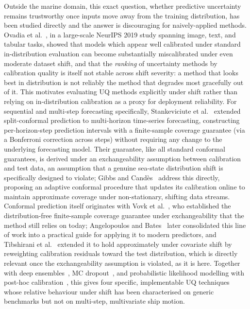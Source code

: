 \documentclass[a4paper,fleqn]{cas-sc}
\begin{document}
Outside the marine domain, this exact question, whether predictive uncertainty remains trustworthy once inputs move away from the training distribution, has been studied directly and the answer is discouraging for naively-applied methods. Ovadia et al.~\cite{ovadia2019can}, in a large-scale NeurIPS 2019 study spanning image, text, and tabular tasks, showed that models which appear well calibrated under standard in-distribution evaluation can become substantially miscalibrated under even moderate dataset shift, and that the \emph{ranking} of uncertainty methods by calibration quality is itself not stable across shift severity: a method that looks best in distribution is not reliably the method that degrades most gracefully out of it. This motivates evaluating UQ methods explicitly under shift rather than relying on in-distribution calibration as a proxy for deployment reliability. For sequential and multi-step forecasting specifically, Stankeviciute et al.~\cite{stankeviciute2021conformal} extended split-conformal prediction to multi-horizon time-series forecasting, constructing per-horizon-step prediction intervals with a finite-sample coverage guarantee (via a Bonferroni correction across steps) without requiring any change to the underlying forecasting model. Their guarantee, like all standard conformal guarantees, is derived under an exchangeability assumption between calibration and test data, an assumption that a genuine sea-state distribution shift is specifically designed to violate; Gibbs and Candès~\cite{gibbs2021adaptive} address this directly, proposing an adaptive conformal procedure that updates its calibration online to maintain approximate coverage under non-stationary, shifting data streams. Conformal prediction itself originates with Vovk et al.~\cite{vovk2005algorithmic}, who established the distribution-free finite-sample coverage guarantee under exchangeability that the method still relies on today; Angelopoulos and Bates~\cite{angelopoulos2023conformal} later consolidated this line of work into a practical guide for applying it to modern predictors, and Tibshirani et al.~\cite{tibshirani2019conformal} extended it to hold approximately under covariate shift by reweighting calibration residuals toward the test distribution, which is directly relevant once the exchangeability assumption is violated, as it is here. Together with deep ensembles~\cite{lakshminarayanan2017}, MC dropout~\cite{gal2016dropout}, and probabilistic likelihood modelling with post-hoc calibration~\cite{kuleshov2018calibrated}, this gives four specific, implementable UQ techniques whose relative behaviour under shift has been characterised on generic benchmarks but not on multi-step, multivariate ship motion.
\end{document}
